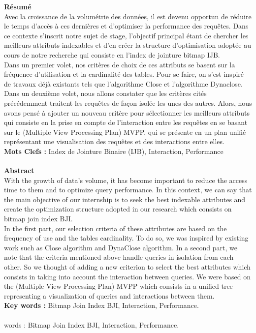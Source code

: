 \documentclass[10pt,a4paper ]{report}
\begin{document}
\textbf{Résumé}\\
Avec la croissance de la volumétrie des données, il est devenu opportun de réduire le temps d’accès à ces dernières et d’optimiser la performance des requêtes. Dans ce contexte s’inscrit notre sujet de stage, l’objectif principal étant de chercher les meilleurs attributs indexables et d’en créer la structure d’optimisation adoptée au cours de notre recherche qui consiste en l’index de jointure bitmap IJB.\\
Dans un premier volet, nos critères de choix de ces attributs se basent sur la fréquence d’utilisation et la cardinalité des tables. Pour se faire, on s’est inspiré de travaux déjà existants tels que l’algorithme Close et l’algorithme Dynaclose. Dans un deuxième volet, nous allons constater que les critères cités précédemment traitent les requêtes de façon isolée les unes des autres. Alors, nous avons pensé à ajouter un nouveau critère pour sélectionner les meilleurs attributs qui consiste en la prise en compte de l’interaction entre les requêtes en se basant sur le (Multiple View Processing Plan) MVPP, qui se présente en un plan unifié représentant une visualisation des requêtes et des interactions entre elles.\\
\textbf{Mots Clefs : }Index de Jointure Binaire (IJB), Interaction, Performance\\ \ \\
\textbf{Abstract}\\
With the growth of data’s volume, it has become important to reduce the access time to them and to optimize query performance. In this context, we can say that the main objective of our internship is to seek  the best indexable attributes and create the optimization structure adopted in our research which consists on bitmap join index BJI.\\
In the first part, our selection criteria of these attributes are based on the frequency of use and the tables cardinality. To do so, we was inspired by existing work such as Close algorithm and DynaClose algorithm. In a second part, we note that the criteria mentioned above handle queries in isolation from each other. So we thought of adding a new criterion to select the best attributes which consists in taking into account the interaction between queries. We were based on the (Multiple View Processing Plan) MVPP which consists in a unified tree representing a visualization of queries and interactions between them.\\
\textbf{Key words :} Bitmap Join Index BJI, Interaction, Performance.\\ \ \\
words : Bitmap Join Index BJI, Interaction, Performance.



    
\end{document}
